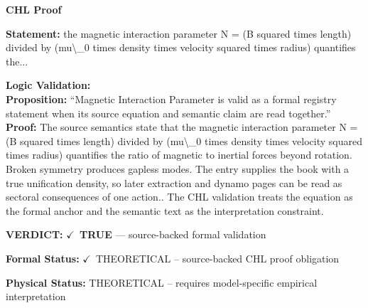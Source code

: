 \vspace{0.45em}
\noindent\textbf{CHL Proof}\par
\textbf{Statement:} the magnetic interaction parameter N = (B squared times length) divided by (mu\textbackslash{}\_0 times
density times velocity squared times radius) quantifies the...

\textbf{Logic Validation:}\\
\textbf{Proposition:} ``Magnetic Interaction Parameter is valid as a formal registry statement when its source
equation and semantic claim are read together.''\\
\textbf{Proof:} The source semantics state that the magnetic interaction parameter N = (B squared times
length) divided by (mu\textbackslash{}\_0 times density times velocity squared times radius) quantifies
the ratio of magnetic to inertial forces beyond rotation. Broken symmetry produces
gapless modes. The entry supplies the book with a true unification density, so later
extraction and dynamo pages can be read as sectoral consequences of one action.. The CHL
validation treats the equation as the formal anchor and the semantic text as the
interpretation constraint.

\textbf{VERDICT:} \ensuremath{\checkmark}\ \textbf{TRUE} --- source-backed formal validation

\textbf{Formal Status:} \ensuremath{\checkmark}\ THEORETICAL -- source-backed CHL proof obligation

\textbf{Physical Status:} THEORETICAL -- requires model-specific empirical interpretation
\par\vspace{0.45em}
\par
\ifTZPDarkEdition
{}
\fi
\endgroup
\endgroup
